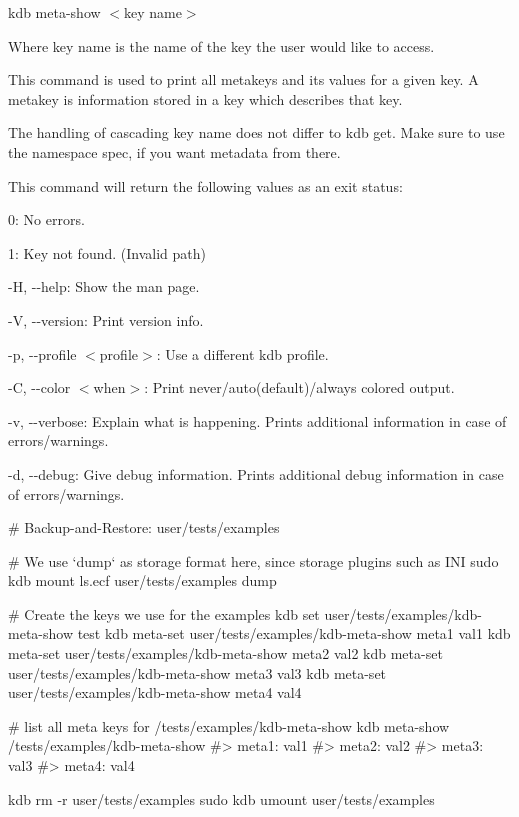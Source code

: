 {\ttfamily kdb meta-\/show $<$key name$>$}~\newline


Where {\ttfamily key name} is the name of the key the user would like to access.

This command is used to print all metakeys and its values for a given key. A metakey is information stored in a key which describes that key.

The handling of cascading {\ttfamily key name} does not differ to {\ttfamily kdb get}. Make sure to use the namespace {\ttfamily spec}, if you want metadata from there.

This command will return the following values as an exit status\+:~\newline



\begin{DoxyItemize}
\item 0\+: No errors.
\item 1\+: Key not found. (Invalid {\ttfamily path})
\end{DoxyItemize}


\begin{DoxyItemize}
\item {\ttfamily -\/H}, {\ttfamily -\/-\/help}\+: Show the man page.
\item {\ttfamily -\/V}, {\ttfamily -\/-\/version}\+: Print version info.
\item {\ttfamily -\/p}, {\ttfamily -\/-\/profile $<$profile$>$}\+: Use a different kdb profile.
\item {\ttfamily -\/C}, {\ttfamily -\/-\/color $<$when$>$}\+: Print never/auto(default)/always colored output.
\item {\ttfamily -\/v}, {\ttfamily -\/-\/verbose}\+: Explain what is happening. Prints additional information in case of errors/warnings.
\item {\ttfamily -\/d}, {\ttfamily -\/-\/debug}\+: Give debug information. Prints additional debug information in case of errors/warnings.
\end{DoxyItemize}


\begin{DoxyCode}
# Backup-and-Restore: user/tests/examples

# We use `dump` as storage format here, since storage plugins such as INI
sudo kdb mount ls.ecf user/tests/examples dump

# Create the keys we use for the examples
kdb set user/tests/examples/kdb-meta-show test
kdb meta-set user/tests/examples/kdb-meta-show meta1 val1
kdb meta-set user/tests/examples/kdb-meta-show meta2 val2
kdb meta-set user/tests/examples/kdb-meta-show meta3 val3
kdb meta-set user/tests/examples/kdb-meta-show meta4 val4

# list all meta keys for /tests/examples/kdb-meta-show
kdb meta-show /tests/examples/kdb-meta-show
#> meta1: val1
#> meta2: val2
#> meta3: val3
#> meta4: val4

kdb rm -r user/tests/examples
sudo kdb umount user/tests/examples
\end{DoxyCode}



